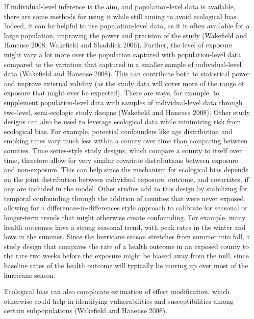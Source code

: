 \documentclass[]{article}
\begin{document}
If individual-level inference is the aim, and population-level data is
available, there are some methods for using it while still aiming to
avoid ecological bias. Indeed, it can be helpful to use population-level
data, as it is often available for a large population, improving the
power and precision of the study (Wakefield and Haneuse 2008; Wakefield
and Shaddick 2006). Further, the level of exposure might vary a lot more
over the population captured with population-level data compared to the
variation that captured in a smaller sample of individual-level data
(Wakefield and Haneuse 2008). This can contribute both to statistical
power and improve external validity (as the study data will cover more
of the range of exposure that might ever be expected). There are ways,
for example, to supplement population-level data with samples of
individual-level data through two-level, semi-ecologic study designs
(Wakefield and Haneuse 2008). Other study designs can also be used to
leverage ecological data while minimizing risk from ecological bias. For
example, potential confounders like age distribution and smoking rates
vary much less within a county over time than comparing between
counties. Time series-style study designs, which compare a county to
itself over time, therefore allow for very similar covariate
distributions between exposure and non-exposure. This can help since the
mechanism for ecological bias depends on the joint distribution between
individual exposure, outcome, and covariates, if any are included in the
model. Other studies add to this design by stabilizing for temporal
confounding through the addition of counties that were never exposed,
allowing for a differences-in-differences style approach to calibrate
for seasonal or longer-term trends that might otherwise create
confounding. For example, many health outcomes have a strong seasonal
trend, with peak rates in the winter and lows in the summer. Since the
hurricane season stretches from summer into fall, a study design that
compares the rate of a health outcome in an exposed county to the rate
two weeks before the exposure might be biased away from the null, since
baseline rates of the health outcome will typically be moving up over
most of the hurricane season.

Ecological bias can also complicate estimation of effect modification,
which otherwise could help in identifying vulnerabilities and
susceptibilities among certain subpopulations (Wakefield and Haneuse
2008).
\end{document}
